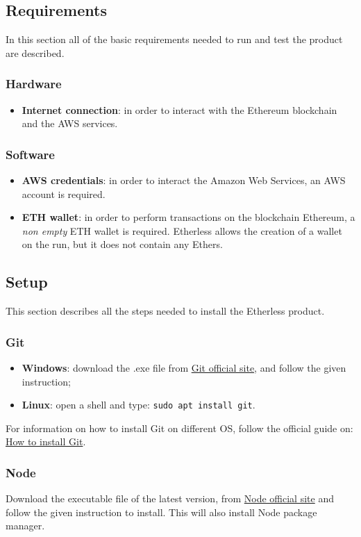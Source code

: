 \subsection{Requirements}
In this section all of the basic requirements needed to run and test the product are described.
\subsubsection{Hardware}
\begin{itemize}
	\item \textbf{Internet connection}: in order to interact with the Ethereum blockchain and the AWS services.
\end{itemize}
\subsubsection{Software}
\begin{itemize}
	\item \textbf{AWS credentials}: in order to interact the Amazon Web Services, an AWS account is required.
	\item \textbf{ETH wallet}: in order to perform transactions on the blockchain Ethereum, a \textit{non empty} ETH wallet is required. Etherless allows the creation of a wallet on the run, but it does not contain any Ethers.
\end{itemize}
\subsection{Setup}
This section describes all the steps needed to install the Etherless product. 
\subsubsection{Git}
\begin{itemize}
	\item \textbf{Windows}: download the .exe file from \href{https://git-scm.com/download/win}{Git official site}, and follow the given instruction;
	\item \textbf{Linux}: open a shell and type: \texttt{sudo apt install git}.
\end{itemize}
	For information on how to install Git on different OS, follow the official guide on: \href{https://git-scm.com/book/en/v2/Getting-Started-Installing-Git}{How to install Git}.
\subsubsection{Node}
	Download the executable file of the latest version, from \href{https://nodejs.org/it/download/}{Node official site} and follow the given instruction to install. This will also install Node package manager.
